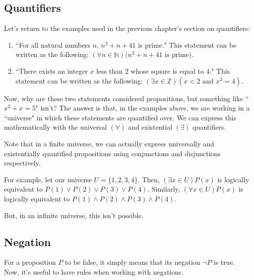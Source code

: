\documentclass[openany]{book}
\begin{document}
\subsection{Quantifiers} Let's return to the examples used in the previous chapter's section on quantifiers:
\begin{enumerate}
	\item ``For all natural numbers $n$, $n^2+n+41$ is prime." This statement can be written as the following: $(\forall n\in\mathbb{N})(n^2+n+41 \text{ is prime)}$.
	\item ``There exists an integer $x$ less than $2$ whose square is equal to $4$." This statement can be written as the following: $(\exists x\in\mathbb{Z})(x<2 \text{ and } x^2=4)$.
\end{enumerate}
Now, why are these two statements considered propositions, but something like ``$x^2+x=5$" isn't? The answer is that, in the examples above, we are working in a ``universe" in which these statements are quantified over. We can express this mathematically with the universal $(\forall)$ and existential $(\exists)$ quantifiers.

Note that in a finite universe, we can actually express universally and existentially quantified propositions using conjunctions and disjunctions respectively.

For example, let our universe $U=\{1,2,3,4\}$. Then, $(\exists x\in U)P(x)$ is logically equivalent to $P(1)\lor P(2)\lor P(3)\lor P(4)$. Similarly, $(\forall x\in U)P(x)$ is logically equivalent to $P(1)\land P(2)\land P(3)\land P(4)$.

But, in an infinite universe, this isn't possible.

\subsection{Negation} For a proposition $P$ to be false, it simply means that its negation $\neg P$ is true. Now, it's useful to have rules when working with negations.
\end{document}

